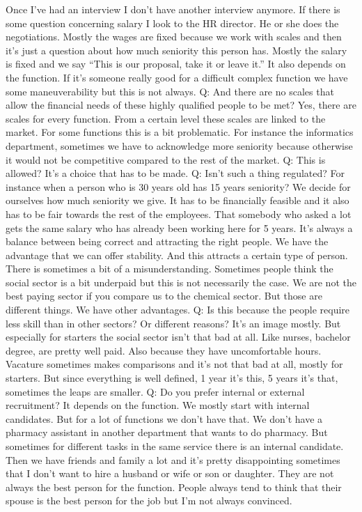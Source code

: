 \documentclass[a4paper,fleqn,11pt,dvips,titlepage]{article}
\numberwithin{figure}{section}
\numberwithin{equation}{section}
\begin{document}
Once I’ve had an interview I don’t have another interview anymore. If there is some question concerning salary I look to the HR director. He or she does the negotiations. Mostly the wages are fixed because we work with scales and then it’s just a question about how much seniority this person has. Mostly the salary is fixed and we say “This is our proposal, take it or leave it.” It also depends on the function. If it’s someone really good for a difficult complex function we have some maneuverability but this is not always. 
Q: And there are no scales that allow the financial needs of these highly qualified people to be met? 
Yes, there are scales for every function. From a certain level these scales are linked to the market. For some functions this is a bit problematic. For instance the informatics department, sometimes we have to acknowledge more seniority because otherwise it would not be competitive compared to the rest of the market. 
Q: This is allowed?
It’s a choice that has to be made. 
Q: Isn’t such a thing regulated? For instance when a person who is 30 years old has 15 years seniority?
We decide for ourselves how much seniority we give. It has to be financially feasible and it also has to be fair towards the rest of the employees. That somebody who asked a lot gets the same salary who has already been working here for 5 years. It’s always a balance between being correct and attracting the right people. We have the advantage that we can offer stability. And this attracts a certain type of person. There is sometimes a bit of a misunderstanding. Sometimes people think the social sector is a bit underpaid but this is not necessarily the case. We are not the best paying sector if you compare us to the chemical sector. But those are different things. We have other advantages. 
Q: Is this because the people require less skill than in other sectors? Or different reasons?
It’s an image mostly. But especially for starters the social sector isn’t that bad at all. Like nurses, bachelor degree, are pretty well paid. Also because they have uncomfortable hours. Vacature sometimes makes comparisons and it’s not that bad at all, mostly for starters. But since everything is well defined, 1 year it’s this, 5 years it’s that, sometimes the leaps are smaller. 
Q: Do you prefer internal or external recruitment?
It depends on the function. We mostly start with internal candidates. But for a lot of functions we don’t have that. We don’t have a pharmacy assistant in another department that wants to do pharmacy. But sometimes for different tasks in the same service there is an internal candidate. Then we have friends and family a lot and it’s pretty disappointing sometimes that I don’t want to hire a husband or wife or son or daughter. They are not always the best person for the function. People always tend to think that their spouse is the best person for the job but I’m not always convinced. 
\end{document}
